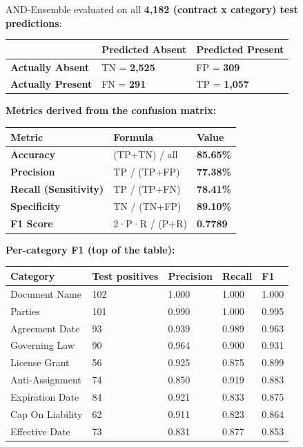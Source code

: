\documentclass[
  10pt,
]{article}
\begin{document}
AND-Ensemble evaluated on all \textbf{4,182 (contract x category) test
predictions}:

\begin{longtable}[]{@{}lll@{}}
\toprule
& Predicted \textbf{Absent} & Predicted \textbf{Present} \\
\midrule
\endhead
\textbf{Actually Absent} & TN = \textbf{2,525} & FP = \textbf{309} \\
\textbf{Actually Present} & FN = \textbf{291} & TP = \textbf{1,057} \\
\bottomrule
\end{longtable}

\textbf{Metrics derived from the confusion matrix:}

\begin{longtable}[]{@{}lll@{}}
\toprule
Metric & Formula & Value \\
\midrule
\endhead
\textbf{Accuracy} & (TP+TN) / all & \textbf{85.65\%} \\
\textbf{Precision} & TP / (TP+FP) & \textbf{77.38\%} \\
\textbf{Recall (Sensitivity)} & TP / (TP+FN) & \textbf{78.41\%} \\
\textbf{Specificity} & TN / (TN+FP) & \textbf{89.10\%} \\
\textbf{F1 Score} & 2·P·R / (P+R) & \textbf{0.7789} \\
\bottomrule
\end{longtable}

\textbf{Per-category F1 (top of the table):}

\begin{longtable}[]{@{}lllll@{}}
\toprule
Category & Test positives & Precision & Recall & F1 \\
\midrule
\endhead
Document Name & 102 & 1.000 & 1.000 & 1.000 \\
Parties & 101 & 0.990 & 1.000 & 0.995 \\
Agreement Date & 93 & 0.939 & 0.989 & 0.963 \\
Governing Law & 90 & 0.964 & 0.900 & 0.931 \\
License Grant & 56 & 0.925 & 0.875 & 0.899 \\
Anti-Assignment & 74 & 0.850 & 0.919 & 0.883 \\
Expiration Date & 84 & 0.921 & 0.833 & 0.875 \\
Cap On Liability & 62 & 0.911 & 0.823 & 0.864 \\
Effective Date & 73 & 0.831 & 0.877 & 0.853 \\
\bottomrule
\end{longtable}
\end{document}
